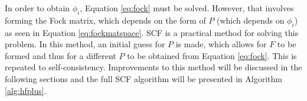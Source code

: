 \documentclass[final,3p,times,twocolumn]{elsarticle}
\begin{document}
In order to obtain $\phi_i$, Equation \eqref{eq:fock} must be solved. However, that involves forming the Fock matrix, which depends on the form of $P$ (which depends on $\phi_i$) as seen in Equation \eqref{eq:fockmatspace}. SCF is a practical method for solving this problem. In this method, an initial guess for $P$ is made, which allows for $F$ to be formed and thus for a different $P$ to be obtained from Equation \eqref{eq:fock}. This is repeated to self-consistency. %
Improvements to this method will be discussed in the following sections and the full SCF algorithm will be presented in Algorithm \ref{alg:hfplus}.
\end{document}
